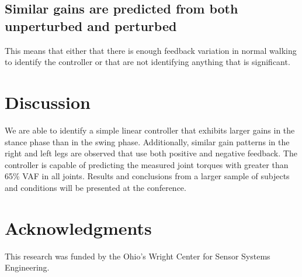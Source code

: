 \documentclass{article}
\begin{document}
\subsection*{Similar gains are predicted from both unperturbed and perturbed}
%
This means that either that there is enough feedback variation in normal
walking to identify the controller or that are not identifying anything that is
significant.

\section*{Discussion}
%
We are able to identify a simple linear controller that exhibits larger gains
in the stance phase than in the swing phase. Additionally, similar gain
patterns in the right and left legs are observed that use both positive and
negative feedback. The controller is capable of predicting the measured joint
torques with greater than 65\% VAF in all joints. Results and conclusions from
a larger sample of subjects and conditions will be presented at the conference.

\section*{Acknowledgments}

This research was funded by the Ohio's Wright Center for Sensor Systems
Engineering.



\end{document}
